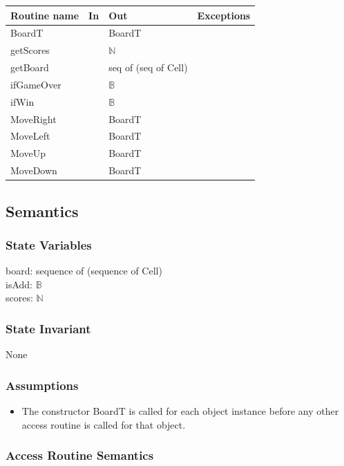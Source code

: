 \documentclass[12pt]{article}
\begin{document}
\begin{tabular}{| l | l | l | l |}
\hline
\textbf{Routine name} & \textbf{In} & \textbf{Out} & \textbf{Exceptions}\\
\hline
BoardT & ~ & BoardT & \\
\hline
getScores & ~ & $\mathbb{N}$ & \\
\hline
getBoard & ~ & seq of (seq of Cell) & \\
\hline
ifGameOver & ~ & $\mathbb{B}$ & \\
\hline
ifWin & ~ & $\mathbb{B}$ & \\
\hline
MoveRight & ~ & BoardT & \\
\hline
MoveLeft & ~ & BoardT & \\
\hline
MoveUp & ~ & BoardT & \\
\hline
MoveDown & ~ & BoardT & \\
\hline
\end{tabular}

\subsection* {Semantics}

\subsubsection* {State Variables}

board: sequence of (sequence of Cell) \\
isAdd: $\mathbb{B}$ \\
scores: $\mathbb{N}$

\subsubsection* {State Invariant}

None

\subsubsection* {Assumptions}

\begin{itemize}
  \item The constructor BoardT is called for each object instance before any other access
  routine is called for that object.
\end{itemize}

\subsubsection* {Access Routine Semantics}
\end{document}
